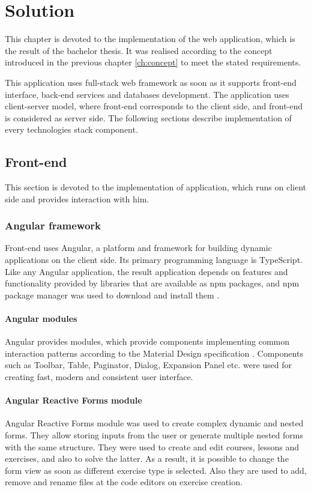 \chapter[Solution]{Solution}
\label{ch:solution}
This chapter is devoted to the implementation of the web application, which is the result of the bachelor thesis. It was realised according to the concept introduced in the previous chapter \ref{ch:concept}  to meet the stated requirements.

This application uses full-stack web framework as soon as it supports front-end interface, back-end services and databases development. The application uses client-server model, where front-end corresponds to the client side, and front-end is considered as server side. The following sections describe implementation of every technologies stack component.

    \section{Front-end}
    This section is devoted to the implementation of application, which runs on client side and provides interaction with him.
    
        \subsection{Angular framework}
        Front-end uses Angular, a platform and framework for building dynamic applications on the client side. Its primary programming language is TypeScript. Like any Angular application, the result application depends on features and functionality provided by libraries that are available as npm packages, and npm package manager was used to download and install them \cite[Node.js]{angular_getting_started}.
        
            \subsubsection{Angular modules}
            Angular provides modules, which provide components implementing common interaction patterns according to the Material Design specification \cite[Components]{angular_components}. Components such as Toolbar, Table, Paginator, Dialog, Expansion Panel etc. were used for creating fast, modern and consistent user interface.
    
            \subsubsection{Angular Reactive Forms module}
            Angular Reactive Forms module was used to create complex dynamic and nested forms. They allow storing inputs from the user or generate multiple nested forms with the same structure. They were used to create and edit courses, lessons and exercises, and also to solve the latter. As a result, it is possible to change the form view as soon as different exercise type is selected. Also they are used to add, remove and rename files at the code editors on exercise creation.
            
